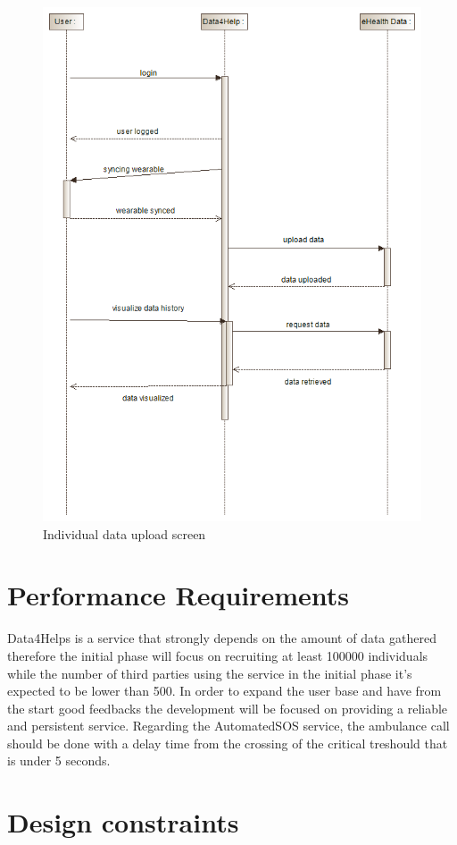 \begin{figure}[H]
  \includegraphics[width=0.79\linewidth]{resources/UML/IndividualInteraction.png}
  \caption{Individual data upload screen}
  \label{fig:Individual sequence diagram}
\end{figure}





\section{Performance Requirements}
Data4Helps is a service that strongly depends on the amount of data gathered therefore the initial phase will focus on recruiting at least 100000 individuals while the number of third parties using the service in the initial phase it's expected to be lower than 500. In order to expand the user base and have from the start good feedbacks the development will be focused on providing a reliable and persistent service. 
Regarding the AutomatedSOS service, the ambulance call should be done with a delay time from the crossing of the critical treshould that is under 5 seconds.

\section{Design constraints}
